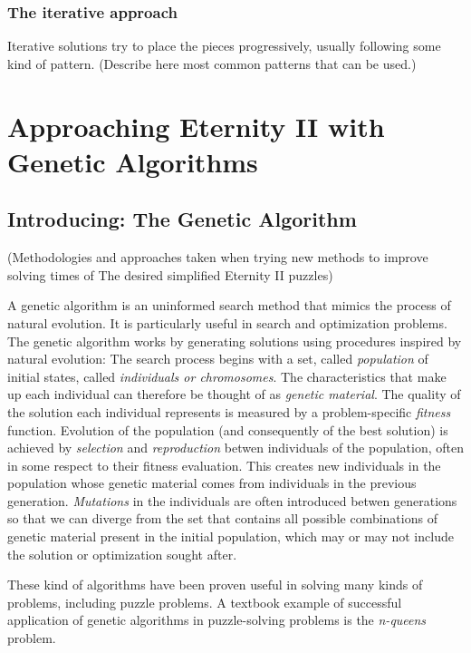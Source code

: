 \documentclass{llncs}
\begin{document}
\subsubsection{The iterative approach}\label{sec:iterative_approach}

Iterative solutions try to place the pieces progressively, usually following some kind of pattern.
(Describe here most common patterns that can be used.)

\section{Approaching Eternity II with Genetic Algorithms}\label{sec:genetic_algorithms}

\subsection{Introducing: The Genetic Algorithm}
(Methodologies and approaches taken when trying new methods to improve solving times of The desired simplified Eternity II puzzles)

A genetic algorithm is an uninformed search method that mimics the process of natural evolution. It is particularly useful in search and optimization problems. The genetic algorithm works by generating solutions using procedures inspired by natural evolution: The search process begins with a set, called \textit{population} of initial states, called \textit{individuals or chromosomes}. The characteristics that make up each individual can therefore be thought of as \textit{genetic material}. The quality of the solution each individual represents is measured by a problem-specific \textit{fitness} function. Evolution of the population (and consequently of the best solution) is achieved by \textit{selection} and \textit{reproduction} betwen individuals of the population, often in some respect to their fitness evaluation. This creates new individuals in the population whose genetic material comes from individuals in the previous generation.
\textit{Mutations} in the individuals are often introduced betwen generations so that we can diverge from the set that contains all possible combinations of genetic material present in the initial population, which may or may not include the solution or optimization sought after.

These kind of algorithms have been proven useful in solving many kinds of problems, including puzzle problems. A textbook example of successful application of genetic algorithms in puzzle-solving problems is the \textit{n-queens} problem\cite{eastridge}.
\end{document}
